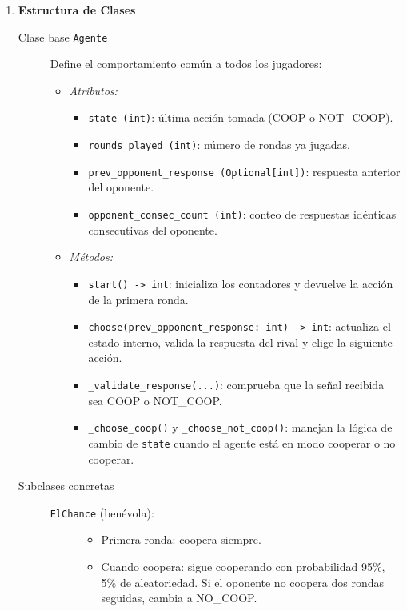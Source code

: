 \documentclass{article}
\begin{document}
\begin{enumerate}
  \item \textbf{Estructura de Clases}
    \begin{description}
      \item[Clase base \texttt{Agente}] Define el comportamiento común a todos los jugadores:
        \begin{itemize}
          \item \emph{Atributos:}
            \begin{itemize}
              \item \texttt{state (int)}: última acción tomada (COOP o NOT\_COOP).
              \item \texttt{rounds\_played (int)}: número de rondas ya jugadas.
              \item \texttt{prev\_opponent\_response (Optional[int])}: respuesta anterior del oponente.
              \item \texttt{opponent\_consec\_count (int)}: conteo de respuestas idénticas consecutivas del oponente.
            \end{itemize}
          \item \emph{Métodos:}
            \begin{itemize}
              \item \texttt{start() -> int}: inicializa los contadores y devuelve la acción de la primera ronda.
              \item \texttt{choose(prev\_opponent\_response: int) -> int}: actualiza el estado interno, valida la respuesta del rival y elige la siguiente acción.
              \item \texttt{\_validate\_response(...)}: comprueba que la señal recibida sea COOP o NOT\_COOP.
              \item \texttt{\_choose\_coop()} y \texttt{\_choose\_not\_coop()}: manejan la lógica de cambio de \texttt{state} cuando el agente está en modo cooperar o no cooperar.
            \end{itemize}
        \end{itemize}
      \item[Subclases concretas]
        \begin{description}
          \item[\texttt{ElChance} (benévola):]
            \begin{itemize}
              \item Primera ronda: coopera siempre.
              \item Cuando coopera: sigue cooperando con probabilidad 95\%, 5\% de aleatoriedad. Si el oponente no coopera dos rondas seguidas, cambia a NO\_COOP.

\end{itemize}
\end{description}
\end{description}
\end{enumerate}
\end{document}
